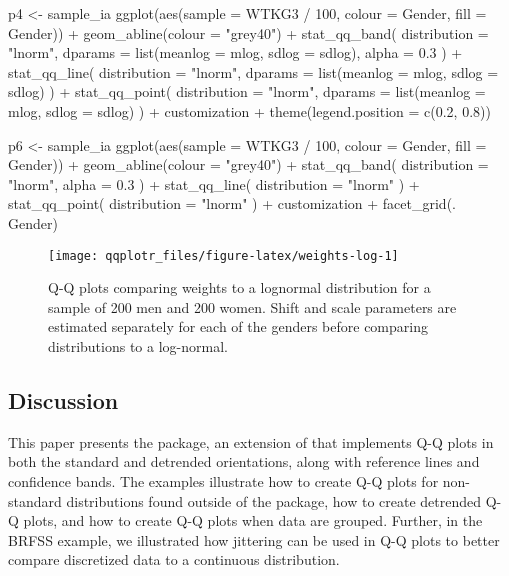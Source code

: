 \begin{Schunk}
\begin{Sinput}
p4 <- sample_ia %>% 
  ggplot(aes(sample = WTKG3 / 100, colour = Gender, fill = Gender)) +
  geom_abline(colour = "grey40") +
  stat_qq_band(
    distribution = "lnorm",
    dparams = list(meanlog = mlog, sdlog = sdlog),
    alpha = 0.3
  ) +
  stat_qq_line(
    distribution = "lnorm",
    dparams = list(meanlog = mlog, sdlog = sdlog)
  ) +
  stat_qq_point(
    distribution = "lnorm",
    dparams = list(meanlog = mlog, sdlog = sdlog)
  ) +
  customization +
  theme(legend.position = c(0.2, 0.8)) 

p6 <- sample_ia %>% 
  ggplot(aes(sample = WTKG3 / 100, colour = Gender, fill = Gender)) +
  geom_abline(colour = "grey40") +
  stat_qq_band(
    distribution = "lnorm", 
    alpha = 0.3
  ) +
  stat_qq_line(
    distribution = "lnorm"
  ) +
  stat_qq_point(
    distribution = "lnorm"
  ) +
  customization + facet_grid(. ~ Gender)
\end{Sinput}
\begin{figure}

{\centering \texttt{[image: qqplotr\_files/figure-latex/weights-log-1]} 

}

\caption[Q-Q plots comparing weights to a lognormal distribution for a sample of 200 men and 200 women]{Q-Q plots comparing weights to a lognormal distribution for a sample of 200 men and 200 women. Shift and scale parameters are estimated separately for each of the genders before comparing distributions to a log-normal.}\label{fig:weights-log}
\end{figure}
\end{Schunk}

\subsection{Discussion}\label{discussion}


This paper presents the  package, an extension of
 that implements Q-Q plots in both the standard and
detrended orientations, along with reference lines and confidence bands.
The examples illustrate how to create Q-Q plots for non-standard
distributions found outside of the  package, how to create
detrended Q-Q plots, and how to create Q-Q plots when data are grouped.
Further, in the BRFSS example, we illustrated how jittering can be used
in Q-Q plots to better compare discretized data to a continuous
distribution.

